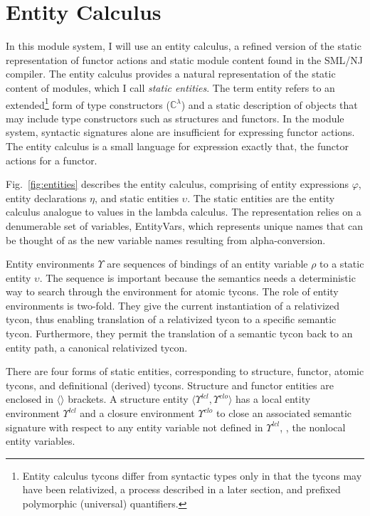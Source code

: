 \chapter{Entity Calculus}\label{ch:entitycalc} 
In this module system, I will use an entity calculus, a refined
version of the static representation of functor actions and static
module content found in the SML/NJ compiler. The entity calculus
provides a natural representation of the static content of modules,
which I call \emph{static entities}. The term entity refers to an
extended\footnote{Entity calculus tycons differ from syntactic types
  only in that the tycons may have been relativized, a process
  described in a later section, and prefixed polymorphic (universal) quantifiers.}
form of type constructors ($\mathbb{C}^\lambda$) and a static
description of objects that may include type constructors such as
structures and functors. In the module system, syntactic signatures
alone are insufficient for expressing functor actions. The entity
calculus is a small language for expression exactly that, the functor
actions for a functor. 
   

   
Fig.~\ref{fig:entities} describes the entity calculus, comprising of
entity expressions $\varphi$, entity declarations $\eta$, and static
entities $\upsilon$. The static entities are the entity calculus
analogue to values in the lambda calculus. The representation relies
on a denumerable set of variables, EntityVars, which represents unique names that can be thought of as the new variable names resulting from alpha-conversion.
  
Entity environments $\Upsilon$ are sequences of bindings of an entity
variable $\rho$ to a static entity $\upsilon$. The sequence is
important because the semantics needs a deterministic way to search
through the environment for atomic tycons. The role of entity environments is two-fold. They give the
current instantiation of a relativized tycon, thus enabling
translation of a relativized tycon to a specific semantic
tycon. Furthermore, they permit the translation of a semantic tycon
back to an entity path, a canonical relativized tycon. 
     
There are four forms of static entities, corresponding to structure, functor, atomic tycons, and definitional
(derived) tycons. Structure and functor entities are enclosed in
$\langle\rangle$ brackets. A structure entity
$\langle\Upsilon^{lcl},\Upsilon^{clo} \rangle$ has a
local entity environment $\Upsilon^{lcl}$ and a closure environment
$\Upsilon^{clo}$ to close an associated semantic signature with respect to any entity variable not defined in $\Upsilon^{lcl}$, \ie, the nonlocal entity variables. 

